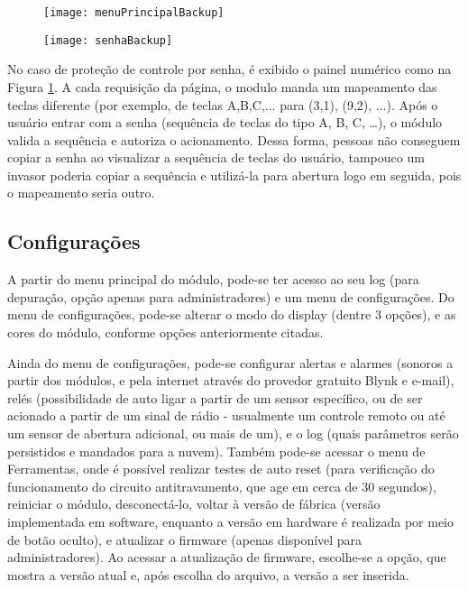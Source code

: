 \begin{figure}[hbp]
    \centering
    \begin{minipage}{.4\linewidth}
        \centering
        \texttt{[image: menuPrincipalBackup]}
        \label{fig:menuPrincipalBackup}
    \end{minipage}
    \hfill
    \begin{minipage}{.4\linewidth}
        \centering
        \texttt{[image: senhaBackup]}
        \label{fig:senhaBackup}
    \end{minipage}
\end{figure}

No caso de proteção de controle por senha, é exibido o painel numérico como na Figura \ref{fig:senhaBackup}. A cada requisição da página, o modulo manda um mapeamento das teclas diferente (por exemplo, de teclas A,B,C,... para (3,1), (9,2), ...). Após o usuário entrar com a senha (sequência de teclas do tipo A, B, C, …), o módulo valida a sequência e autoriza o acionamento. Dessa forma, pessoas não conseguem copiar a senha ao visualizar a sequência de teclas do usuário, tampouco um invasor poderia copiar a sequência e utilizá-la para abertura logo em seguida, pois o mapeamento seria outro.

\subsection{Configurações}

A partir do menu principal do módulo, pode-se ter acesso ao seu log (para depuração, opção apenas para administradores) e um menu de configurações. Do menu de configurações, pode-se alterar o modo do display (dentre 3 opções), e as cores do módulo, conforme opções anteriormente citadas.

Ainda do menu de configurações, pode-se configurar alertas e alarmes (sonoros a partir dos módulos, e pela internet através do provedor gratuito Blynk e e-mail), relés (possibilidade de auto ligar a partir de um sensor específico, ou de ser acionado a partir de um sinal de rádio - usualmente um controle remoto ou até um sensor de abertura adicional, ou mais de um), e o log (quais parâmetros serão persistidos e mandados para a nuvem). Também pode-se acessar o menu de Ferramentas, onde é possível realizar testes de auto reset (para verificação do funcionamento do circuito antitravamento, que age em cerca de 30 segundos), reiniciar o módulo, desconectá-lo, voltar à versão de fábrica (versão implementada em software, enquanto a versão em hardware é realizada por meio de botão oculto), e atualizar o firmware (apenas disponível para administradores).
Ao acessar a atualização de firmware, escolhe-se a opção, que mostra a versão atual e, após escolha do arquivo, a versão a ser inserida.

